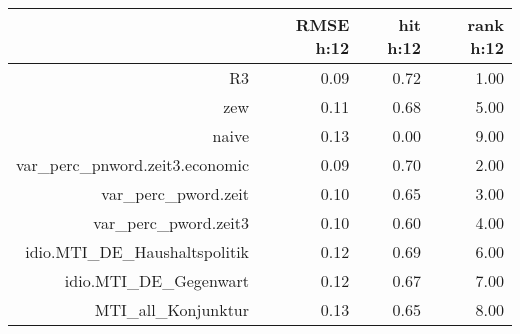 \begin{table}[ht]
\centering
\begin{tabular}{rrrr}
  \hline
 & RMSE h:12 & hit h:12 & rank h:12 \\ 
  \hline
R3 & 0.09 & 0.72 & 1.00 \\ 
  zew & 0.11 & 0.68 & 5.00 \\ 
  naive & 0.13 & 0.00 & 9.00 \\ 
  var\_perc\_pnword.zeit3.economic & 0.09 & 0.70 & 2.00 \\ 
  var\_perc\_pword.zeit & 0.10 & 0.65 & 3.00 \\ 
  var\_perc\_pword.zeit3 & 0.10 & 0.60 & 4.00 \\ 
  idio.MTI\_DE\_Haushaltspolitik & 0.12 & 0.69 & 6.00 \\ 
  idio.MTI\_DE\_Gegenwart & 0.12 & 0.67 & 7.00 \\ 
  MTI\_all\_Konjunktur & 0.13 & 0.65 & 8.00 \\ 
   \hline
\end{tabular}
\end{table}
